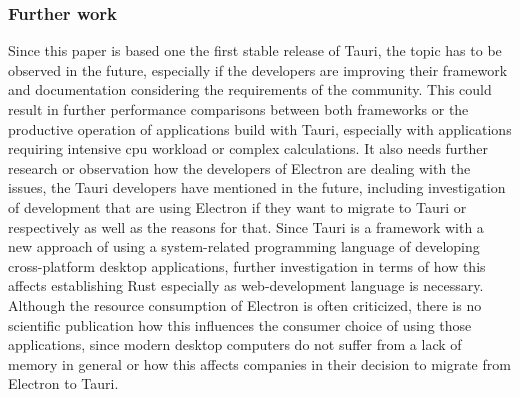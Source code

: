 \subsubsection{Further work}
Since this paper is based one the first stable release of Tauri, the topic has to be observed in the future, especially if the developers are improving their framework and documentation considering the requirements of the community.
This could result in further performance comparisons between both frameworks or the productive operation of applications build with Tauri, especially with applications requiring intensive cpu workload or complex calculations.
It also needs further research or observation how the developers of Electron are dealing with the issues, the Tauri developers have mentioned in the future, including investigation of development that are using Electron if
they want to migrate to Tauri or respectively as well as the reasons for that.
Since Tauri is a framework with a new approach of using a system-related programming language of developing cross-platform desktop applications, further investigation in terms of how this affects establishing Rust especially as web-development language is necessary.
Although the resource consumption of Electron is often criticized, there is no scientific publication how this influences the consumer choice of using those applications, since modern desktop computers do not suffer from a lack of memory in general
or how this affects companies in their decision to migrate from Electron to Tauri.



